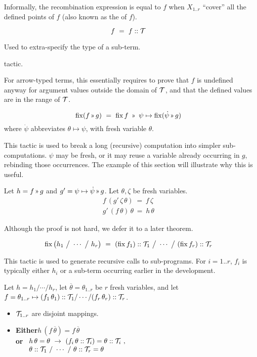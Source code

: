 Informally, the recombination expression is equal to $f$
when $X_{1..r}$ ``cover'' all the defined points of $f$ (also known as the  of $f$).

 \label{tactics:Shrink}
\[f ~=~ f :: \mathcal{T}\] 

Used to extra-specify the type of a sub-term.

\Obligations tactic.

For arrow-typed terms, this essentially requires to prove that $f$ is undefined anyway for
argument values outside the domain of $\mathcal{T}$, and that the defined values are in the range of $\mathcal{T}$.

 \label{tactics:Stratify}
\[\fix (f\applt g) ~=~ \fix f ~\applt~ \psi\mapsto \fix (\dot\psi\applt g)\]
%
where $\dot\psi$ abbreviates $\theta\mapsto\psi$, with fresh variable $\theta$.

This tactic is used to break a long (recursive) computation into simpler sub-computations.
$\psi$ may be fresh, or it may reuse a variable already occurring in $g$, rebinding those occurrences.
The example of this section will illustrate why this is useful.

\Obligations Let $h=f\applt g$ and $g'=\psi\mapsto\dot\psi\applt g$. Let $\theta,\zeta$ be
fresh variables.
\begin{equation}
\renewcommand\arraystretch{1.5}
\begin{array}{l}
f\,(g'\,\zeta\,\theta) ~=~ f\,\zeta \\
g'\,(f\,\theta)\,\theta ~=~ h\,\theta
\end{array}
\label{tactics:Stratify obligations}
\end{equation}

Although the proof is not hard, we defer it to a later theorem.

 \label{tactics:Synth}
\[\operatorname{fix}\big(h_1 ~\big/~ \cdots ~\big/~ h_r\big) ~=~ 
  (\operatorname{fix} f_1) :: \mathcal{T}_1 ~\big/~ \cdots ~\big/~ (\operatorname{fix} f_r) :: \mathcal{T}_r\]

This tactic is used to generate recursive calls to sub-programs. For $i=1..r$, $f_i$
is typically either $h_i$ or a sub-term occurring earlier in the development.

\Obligations Let $h=h_1/\cdots/h_r$, let $\overline\theta\!=\!\theta_{1..r}$ be $r$ fresh variables, and let
$f = \theta_{1..r} \mapsto (f_1\,\theta_1)::\mathcal{T}_1/\cdots/(f_r\,\theta_r)::\mathcal{T}_r$.
\begin{itemize}
  \item $\mathcal{T}_{1..r}$ are disjoint mappings.
  \item {\bf Either}\quad $h\,(f\,\overline\theta) = f\,\overline\theta$ \\{\bf or}\qquad
  $\begin{array}[t]{l} h\,\theta=\theta ~\rightarrow~ (f_i\,\theta :: \mathcal{T}_i)=\theta :: \mathcal{T}_i ~, \\
  \theta::\mathcal{T}_1~/~\cdots~/~\theta::\mathcal{T}_r=\theta\end{array}$
\end{itemize}

